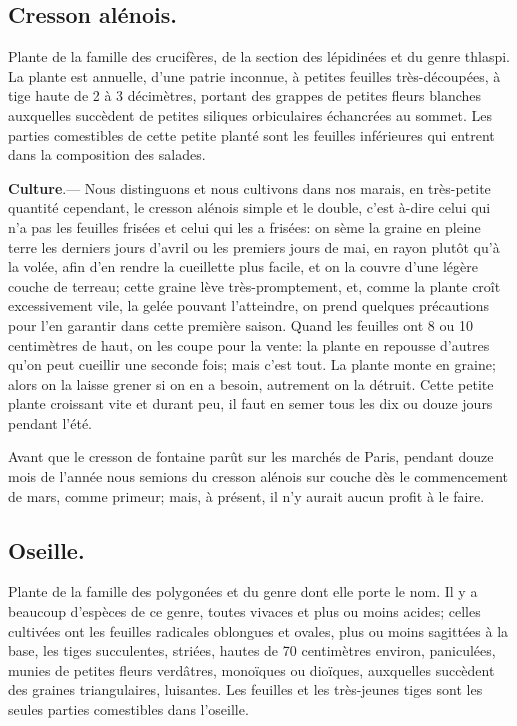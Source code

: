 \documentclass[10pt,a4paper]{book}
\begin{document}
\subsection{Cresson alénois.}

Plante de la famille des crucifères, de la section des lépidinées et du genre thlaspi. La plante est annuelle, d'une patrie inconnue, à petites feuilles très-découpées, à tige haute de 2 à 3 décimètres, portant des grappes de petites fleurs blanches auxquelles succèdent de petites siliques orbiculaires échancrées au sommet. Les parties comestibles de cette petite planté sont les feuilles inférieures qui entrent dans la composition des salades.

\textbf{Culture}.--- Nous distinguons et nous cultivons dans nos marais, en très-petite quantité cependant, le cresson alénois simple et le double, c'est à-dire celui qui n'a pas les feuilles frisées et celui qui les a frisées: on sème la graine en pleine terre les derniers jours d'avril ou les premiers jours de mai, en rayon plutôt qu'à la volée, afin d'en rendre la cueillette plus facile, et on la couvre d'une légère couche de terreau; cette graine lève très-promptement, et, comme la plante croît excessivement vile, la gelée pouvant l'atteindre, on prend quelques précautions pour l'en garantir dans cette première saison. Quand les feuilles ont 8 ou 10 centimètres de haut, on les coupe pour la vente: la plante en repousse d'autres qu'on peut cueillir une seconde fois; mais c'est tout. La plante monte en graine; alors on la laisse grener si on en a besoin, autrement on la détruit. Cette petite plante croissant vite et durant peu, il faut en semer tous les dix ou douze jours pendant l'été.

Avant que le cresson de fontaine parût sur les marchés de Paris, pendant douze mois de l'année nous semions du cresson alénois sur couche dès le commencement de mars, comme primeur; mais, à présent, il n'y aurait aucun profit à le faire.

\subsection{Oseille.}

Plante de la famille des polygonées et du genre dont elle porte le nom. Il y a beaucoup d'espèces de ce genre, toutes vivaces et plus ou moins acides; celles cultivées ont les feuilles radicales oblongues et ovales, plus ou moins sagittées à la base, les tiges succulentes, striées, hautes de 70 centimètres environ, paniculées, munies de petites fleurs verdâtres, monoïques ou dioïques, auxquelles succèdent des graines triangulaires, luisantes. Les feuilles et les très-jeunes tiges sont les seules parties comestibles dans l'oseille.
\end{document}
